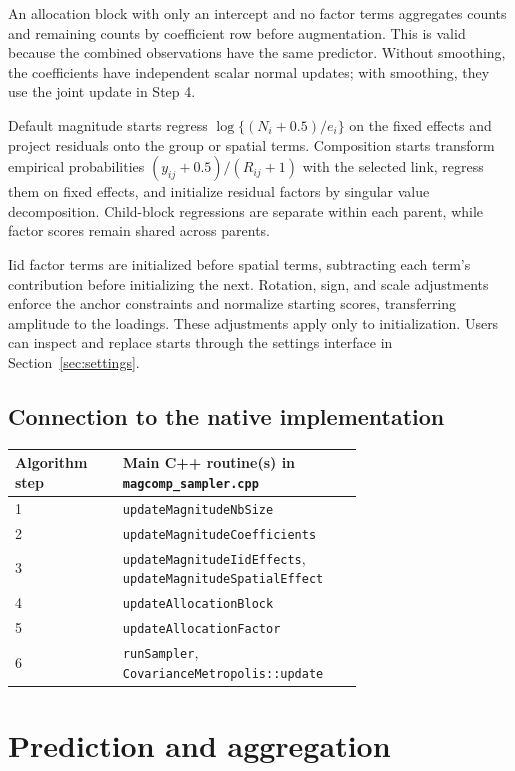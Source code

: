 \documentclass[11pt]{article}
\begin{document}
An allocation block with only an intercept and no factor terms aggregates
counts and remaining counts by coefficient row before augmentation. This is
valid because the combined observations have the same predictor. Without
smoothing, the coefficients have independent scalar normal updates;
with smoothing, they use the joint update in Step 4.

Default magnitude starts regress \(\log\{(N_i+0.5)/e_i\}\) on the fixed
effects and project residuals onto the group or spatial terms.
Composition starts transform empirical probabilities
\((y_{ij}+0.5)/(R_{ij}+1)\) with the selected link, regress them on fixed
effects, and initialize residual factors by singular value decomposition.
Child-block regressions are separate within each parent, while factor scores
remain shared across parents.

Iid factor terms are initialized before spatial terms, subtracting each term's
contribution before initializing the next. Rotation, sign, and scale adjustments
enforce the anchor constraints and normalize starting scores, transferring
amplitude to the loadings. These adjustments apply only to initialization.
Users can inspect and replace starts through the settings interface in
Section~\ref{sec:settings}.

\subsection{Connection to the native implementation}

\begin{center}
\small
\begin{tabular}{@{}lp{0.69\linewidth}@{}}
\toprule
Algorithm step & Main C++ routine(s) in \texttt{magcomp\_sampler.cpp} \\
\midrule
1 & \texttt{updateMagnitudeNbSize} \\
2 & \texttt{updateMagnitudeCoefficients} \\
3 & \texttt{updateMagnitudeIidEffects}, \texttt{updateMagnitudeSpatialEffect} \\
4 & \texttt{updateAllocationBlock} \\
5 & \texttt{updateAllocationFactor} \\
6 & \texttt{runSampler}, \texttt{CovarianceMetropolis::update} \\
\bottomrule
\end{tabular}
\end{center}
\section{Prediction and aggregation}
\label{sec:prediction}
\end{document}
